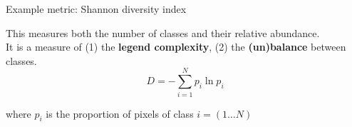 \documentclass[aspectratio=169, 10pt]{beamer}
\begin{document}






\begin{frame}{Example metric: Shannon diversity index}
  \par
  This measures both the number of classes and their relative abundance.\\[2ex]
  It is a measure of (1) the \textbf{legend complexity}, (2) the \textbf{(un)balance} between classes.
    $$ D = - \sum_{i=1}^N p_i \ln p_i$$
  \par
    where $p_i$ is the proportion of pixels of class $i = (1 \ldots N)$
\end{frame}

\end{document}
